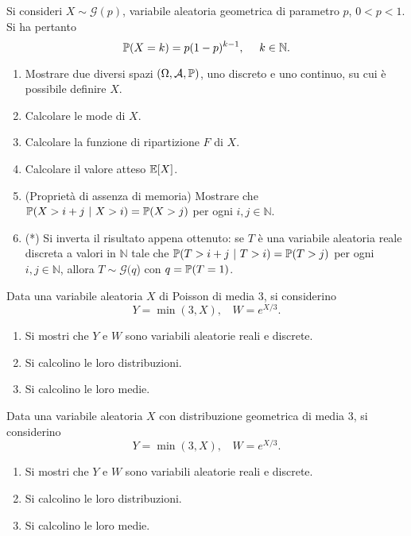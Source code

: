 Si consideri $X\sim \mathcal{G}( p)$, variabile aleatoria geometrica di parametro $p$, $0< p< 1$. Si ha pertanto
\begin{equation*}
\PP( X=k) =p( 1-p)^{k-1} ,\ \ \ \ k\in \mathbb{N} .
\end{equation*}
\begin{enumerate}
\item Mostrare due diversi spazi $( \Omega ,\mathcal{A} ,\mathbb{P})$, uno discreto e uno continuo, su cui è possibile definire $X$.
\item Calcolare le mode di $X$.
\item Calcolare la funzione di ripartizione $F$ di $X$.
\item Calcolare il valore atteso $\mathbb{E}[ X]$.
\item (Proprietà di assenza di memoria) Mostrare che $\mathbb{P}( X >i+j\ |\ X >i) =\mathbb{P}( X >j)$ per ogni $i,j\in \mathbb{N}$.
\item (*) Si inverta il risultato appena ottenuto: se $T$ è una variabile aleatoria reale discreta a valori in $\mathbb{N}$ tale che $\mathbb{P}( T >i+j\ |\ T >i) =\mathbb{P}( T >j)$ per ogni $i,j\in \mathbb{N}$, allora $T\sim \mathcal{G}( q$) con $q=\mathbb{P}( T=1)$.
\end{enumerate}
\Esercizio{}

Data una variabile aleatoria $X$ di Poisson di media $3$, si considerino
\begin{equation*}
Y=\min( 3,X) ,\ \ \ \ W=e^{X/3} .
\end{equation*}
\begin{enumerate}
\item Si mostri che $Y$ e $W$ sono variabili aleatorie reali e discrete.
\item Si calcolino le loro distribuzioni.
\item Si calcolino le loro medie.
\end{enumerate}
\Esercizio{}

Data una variabile aleatoria $X$ con distribuzione geometrica di media $3$, si considerino
\begin{equation*}
Y=\min( 3,X) ,\ \ \ \ W=e^{X/3} .
\end{equation*}
\begin{enumerate}
\item Si mostri che $Y$ e $W$ sono variabili aleatorie reali e discrete.
\item Si calcolino le loro distribuzioni.
\item Si calcolino le loro medie.
\end{enumerate}

